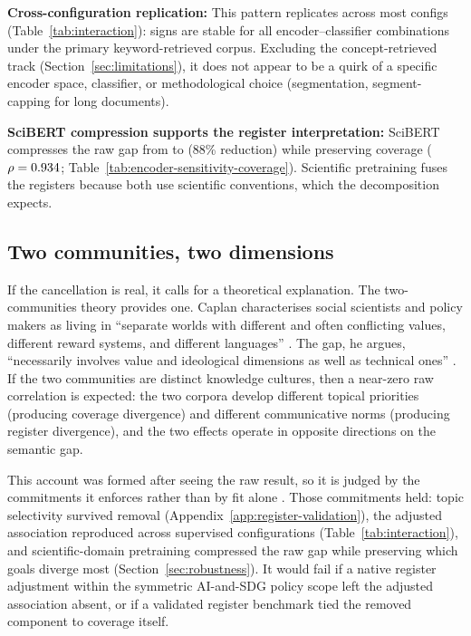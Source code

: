\documentclass[12pt,a4paper]{article}
\begin{document}
\textbf{Cross-configuration replication:} This pattern replicates across most configs (Table~\ref{tab:interaction}): signs are stable for all encoder--classifier combinations under the primary keyword-retrieved corpus. Excluding the concept-retrieved track (Section~\ref{sec:limitations}), it does not appear to be a quirk of a specific encoder space, classifier, or methodological choice (segmentation, segment-capping for long documents).

\textbf{SciBERT compression supports the register interpretation:} SciBERT compresses the raw gap from \MPNetMeanGap{} to \SciBERTMeanGap{} (88\% reduction) while preserving coverage ($\rho = 0.934$; Table~\ref{tab:encoder-sensitivity-coverage}). Scientific pretraining \parencite{Beltagy2019,AllenAI2019Scibert} fuses the registers because both use scientific conventions, which the decomposition expects.

\subsection{Two communities, two dimensions}

If the cancellation is real, it calls for a theoretical explanation. The two-communities theory \parencite{Caplan1979} provides one. Caplan characterises social scientists and policy makers as living in ``separate worlds with different and often conflicting values, different reward systems, and different languages'' \parencite[459]{Caplan1979}. The gap, he argues, ``necessarily involves value and ideological dimensions as well as technical ones'' \parencite[461]{Caplan1979}. If the two communities are distinct knowledge cultures, then a near-zero raw correlation is expected: the two corpora develop different topical priorities (producing coverage divergence) and different communicative norms (producing register divergence), and the two effects operate in opposite directions on the semantic gap.

This account was formed after seeing the raw result, so it is judged by the commitments it enforces rather than by fit alone \parencite{Lakatos1970, HitchcockSober2004}. Those commitments held: topic selectivity survived removal (Appendix~\ref{app:register-validation}), the adjusted association reproduced across supervised configurations (Table~\ref{tab:interaction}), and scientific-domain pretraining compressed the raw gap while preserving which goals diverge most (Section~\ref{sec:robustness}). It would fail if a native register adjustment within the symmetric AI-and-SDG policy scope left the adjusted association absent, or if a validated register benchmark tied the removed component to coverage itself.
\end{document}
